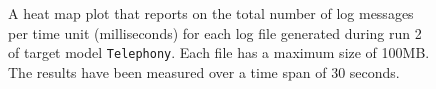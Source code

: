 \begin{figure}[htbp]
\centering
\begin{minipage}{1\textwidth}
  \centering
\end{minipage}
\caption{A heat map plot that reports on the total number of log messages per time unit (milliseconds) for each log file generated during run 2 of target model \texttt{Telephony}. Each file has a maximum size of 100MB. The results have been measured over a time span of 30 seconds.}
\label{figure:throughput_sum_random_det_telephony_2}
\end{figure}